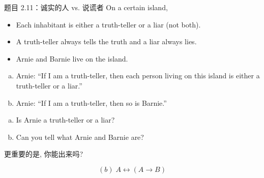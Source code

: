 \begin{frame}{}
  \begin{exampleblock}{题目 2.11：诚实的人 vs. 说谎者}
    On a certain island,
    \begin{itemize}
      \item Each inhabitant is either a truth-teller or a liar (not both).
      \item A truth-teller always tells the truth and a liar always lies.
      \item Arnie and Barnie live on the island.
    \end{itemize}

    \begin{enumerate}[(a)]
      \item Arnie: ``If I am a truth-teller, then each person living on this island is either a truth-teller or a liar.''
      \item Arnie: ``If I am a truth-teller, then so is Barnie.''
    \end{enumerate}
  \end{exampleblock}

  \vspace{0.20cm}
  \pause
  \begin{enumerate}[(a)]
    \item Is Arnie a truth-teller or a liar?
    \item Can you tell what Arnie and Barnie are?
  \end{enumerate}

  \vspace{0.20cm}
  \pause
  \centerline{更重要的是, 你能出来吗?}
  \pause
  \[
    (b) \; A \leftrightarrow (A \to B)
  \]
\end{frame}
